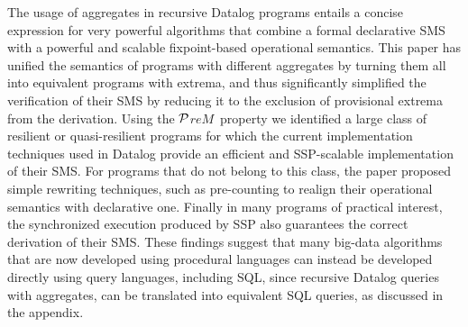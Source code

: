 \documentclass[11pt]{article}
\def\sinv{\vspace{-0.1cm}}
\def\sinv{\vspace{-0.1cm}}
\def\prem{$\cal P$$\!reM$~}
\begin{document}
\sinv The usage of aggregates in recursive Datalog programs  entails a concise expression for very powerful algorithms
that combine a formal declarative SMS with a powerful and scalable fixpoint-based operational semantics.
This paper has  unified the semantics of programs with different aggregates by  turning them all
into equivalent programs with extrema,  and thus significantly simplified the verification of their SMS by
reducing it to the exclusion of provisional extrema from the derivation.  Using the \prem property
we  identified a large class of resilient or quasi-resilient  programs for which the current  implementation techniques
used in Datalog provide an efficient and SSP-scalable implementation  of their SMS.  For programs
that do not belong to this class, the paper proposed simple rewriting techniques, such as pre-counting
to realign their operational semantics with declarative one. Finally in  many programs
of practical interest, the synchronized execution produced by SSP also guarantees the correct derivation of their SMS.
These findings suggest that many big-data algorithms that are now developed using procedural languages
can instead be developed directly using  query languages, including SQL, 
since recursive Datalog queries with aggregates, can be translated into equivalent  SQL queries,
as discussed in the appendix. 

%

%
\end{document}

